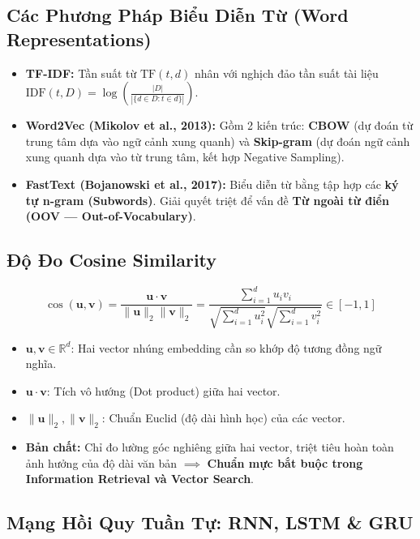 \documentclass[10pt,a4paper]{article}
\begin{document}
\subsection{Các Phương Pháp Biểu Diễn Từ (Word Representations)}
\begin{itemize}[leftmargin=*]
    \item \textbf{TF-IDF:} Tần suất từ $\text{TF}(t, d)$ nhân với nghịch đảo tần suất tài liệu $\text{IDF}(t, D) = \log\left(\frac{|D|}{|\{d \in D: t \in d\}|}\right)$.
    \item \textbf{Word2Vec (Mikolov et al., 2013):} Gồm 2 kiến trúc: \textbf{CBOW} (dự đoán từ trung tâm dựa vào ngữ cảnh xung quanh) và \textbf{Skip-gram} (dự đoán ngữ cảnh xung quanh dựa vào từ trung tâm, kết hợp Negative Sampling).
    \item \textbf{FastText (Bojanowski et al., 2017):} Biểu diễn từ bằng tập hợp các \textbf{ký tự n-gram (Subwords)}. Giải quyết triệt để vấn đề \textbf{Từ ngoài từ điển (OOV --- Out-of-Vocabulary)}.
\end{itemize}

\subsection{Độ Đo Cosine Similarity}
\begin{equation}
    \cos(\mathbf{u}, \mathbf{v}) = \frac{\mathbf{u} \cdot \mathbf{v}}{\|\mathbf{u}\|_2 \|\mathbf{v}\|_2} = \frac{\sum_{i=1}^d u_i v_i}{\sqrt{\sum_{i=1}^d u_i^2} \sqrt{\sum_{i=1}^d v_i^2}} \in [-1, 1]
\end{equation}
\begin{itemize}[leftmargin=*]
    \item $\mathbf{u}, \mathbf{v} \in \mathbb{R}^d$: Hai vector nhúng embedding cần so khớp độ tương đồng ngữ nghĩa.
    \item $\mathbf{u} \cdot \mathbf{v}$: Tích vô hướng (Dot product) giữa hai vector.
    \item $\|\mathbf{u}\|_2, \|\mathbf{v}\|_2$: Chuẩn Euclid (độ dài hình học) của các vector.
    \item \textbf{Bản chất:} Chỉ đo lường góc nghiêng giữa hai vector, triệt tiêu hoàn toàn ảnh hưởng của độ dài văn bản $\implies$ \textbf{Chuẩn mực bắt buộc trong Information Retrieval và Vector Search}.
\end{itemize}

\subsection{Mạng Hồi Quy Tuần Tự: RNN, LSTM \& GRU}
\end{document}
